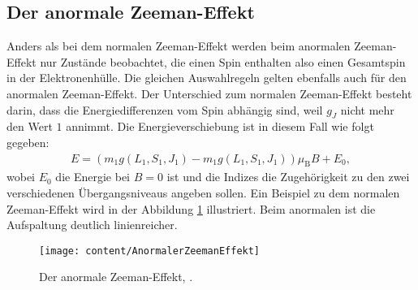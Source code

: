 \subsection{Der anormale Zeeman-Effekt}
Anders als bei dem normalen Zeeman-Effekt werden beim anormalen Zeeman-Effekt nur Zustände beobachtet, die einen Spin enthalten also einen Gesamtspin in der Elektronenhülle. Die gleichen Auswahlregeln gelten ebenfalls auch für den anormalen Zeeman-Effekt. Der Unterschied zum normalen Zeeman-Effekt besteht darin, dass die Energiedifferenzen vom Spin abhängig sind, weil $g_J$ nicht mehr den Wert $1$ annimmt. Die Energieverschiebung ist in diesem Fall wie folgt gegeben:
\begin{align}
E=(m_1g(L_1,S_1,J_1)-m_1g(L_1,S_1,J_1))\mu_\text{B}B+E_0, \label{eqn:Eanomal}
\end{align}
wobei $E_0$ die Energie bei $B=0$ ist und die Indizes die Zugehörigkeit zu den zwei verschiedenen Übergangsniveaus angeben sollen. Ein Beispiel zu dem normalen Zeeman-Effekt wird in der Abbildung \ref{fig:anormalerzeemaneffekt} illustriert. Beim anormalen ist die Aufspaltung deutlich linienreicher.
\begin{figure}[h!]
	\centering
	\texttt{[image: content/AnormalerZeemanEffekt]}
	\caption{Der anormale Zeeman-Effekt, \cite[11]{anleitungV27}.}
	\label{fig:anormalerzeemaneffekt}
\end{figure}
